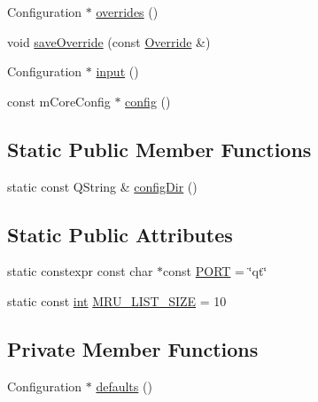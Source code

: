 \begin{DoxyCompactItemize}
\item 
Configuration $\ast$ \mbox{\hyperlink{class_q_g_b_a_1_1_config_controller_a3a1e6f7263f15d8cfc4af1f1793b0aac}{overrides}} ()
\item 
void \mbox{\hyperlink{class_q_g_b_a_1_1_config_controller_a3b27eca39ad08c332c65ee00e9aa7038}{save\+Override}} (const \mbox{\hyperlink{class_q_g_b_a_1_1_override}{Override}} \&)
\item 
Configuration $\ast$ \mbox{\hyperlink{class_q_g_b_a_1_1_config_controller_a301b9fdaa174ea02f2a04d8be86a80c4}{input}} ()
\item 
const m\+Core\+Config $\ast$ \mbox{\hyperlink{class_q_g_b_a_1_1_config_controller_a4f907fd63bc12690c053e57ef7e6c600}{config}} ()
\end{DoxyCompactItemize}
\subsection*{Static Public Member Functions}
\begin{DoxyCompactItemize}
\item 
static const Q\+String \& \mbox{\hyperlink{class_q_g_b_a_1_1_config_controller_a853a8c4196e391ff95040f9c0f2fc0a0}{config\+Dir}} ()
\end{DoxyCompactItemize}
\subsection*{Static Public Attributes}
\begin{DoxyCompactItemize}
\item 
static constexpr const char $\ast$const \mbox{\hyperlink{class_q_g_b_a_1_1_config_controller_a4d9eea8199d4ac98df218f87f3feab9e}{P\+O\+RT}} = \char`\"{}qt\char`\"{}
\item 
static const \mbox{\hyperlink{ioapi_8h_a787fa3cf048117ba7123753c1e74fcd6}{int}} \mbox{\hyperlink{class_q_g_b_a_1_1_config_controller_a45a21e0dac041e2f86108fb2a9e28fe3}{M\+R\+U\+\_\+\+L\+I\+S\+T\+\_\+\+S\+I\+ZE}} = 10
\end{DoxyCompactItemize}
\subsection*{Private Member Functions}
\begin{DoxyCompactItemize}
\item 
Configuration $\ast$ \mbox{\hyperlink{class_q_g_b_a_1_1_config_controller_a9f6de53ccd9e22ae9ba11457f6c5a505}{defaults}} ()
\end{DoxyCompactItemize}
